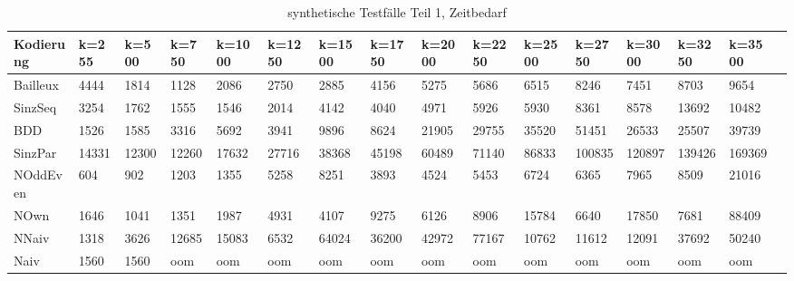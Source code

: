 \documentclass[a4,abstract=on]{scrartcl}
\begin{document}
\begin{landscape}
\begin{adjustwidth*}{-4cm}{-3cm}
\begin{flushleft}
\begin{table}[h!]
    \small
    \setlength{\tabcolsep}{0.11cm}
     \centering
     \begin{tabular}[width=\textwidth]{|l|l|l|l|l|l|l|l|l|l|l|l|l|l|l|l|}
	\hline
       \textbf{Kodierung}  & \textbf{k=255} & \textbf{k=500} & \textbf{k=750} &\textbf{k=1000} &\textbf{k=1250} &\textbf{k=1500} &\textbf{k=1750} &\textbf{k=2000} &\textbf{k=2250} &\textbf{k=2500} &\textbf{k=2750} &\textbf{k=3000} &\textbf{k=3250} &\textbf{k=3500}\\
	\hline
	Bailleux & 4444 & 1814 & 1128 & 2086 & 2750 & 2885 & 4156 & 5275 & 5686 & 6515 & 8246 & 7451 & 8703 & 9654  \\
\hline
	SinzSeq & 3254 & 1762 & 1555 & 1546 & 2014 & 4142 & 4040 & 4971 & 5926 & 5930 & 8361 & 8578 & 13692 & 10482  \\
\hline
	BDD & 1526 & 1585 & 3316 & 5692 & 3941 &9896 &8624 &21905 & 29755 & 35520 & 51451 & 26533 & 25507 & 39739 \\
\hline
	SinzPar & 14331 & 12300 & 12260 & 17632 & 27716 & 38368 & 45198 & 60489 & 71140 & 86833 & 100835 & 120897 & 139426 & 169369  \\
\hline
	NOddEven & 604 & 902 & 1203 & 1355 & 5258 & 8251 & 3893 & 4524 & 5453 & 6724& 6365 & 7965 & 8509 & 21016 \\
\hline
	NOwn & 1646 & 1041 & 1351 & 1987 & 4931 & 4107 & 9275 & 6126 & 8906 & 15784 & 6640 & 17850 & 7681 & 88409\\
 \hline
	NNaiv & 1318 & 3626 & 12685 & 15083 & 6532 & 64024 & 36200 & 42972 & 77167 & 10762 & 11612 & 12091 & 37692 & 50240 \\
\hline
	Naiv & 1560 & 1560 &  oom &  oom &  oom &  oom &  oom &  oom &  oom &  oom &  oom &  oom &  oom &  oom \\
\hline
       
     \end{tabular}

     \caption{synthetische Testfälle Teil 1, Zeitbedarf}
     \label{tbl:beispieltabelle}

   \end{table}
	\end{flushleft}
\end{adjustwidth*}


\end{landscape}
\end{document}
